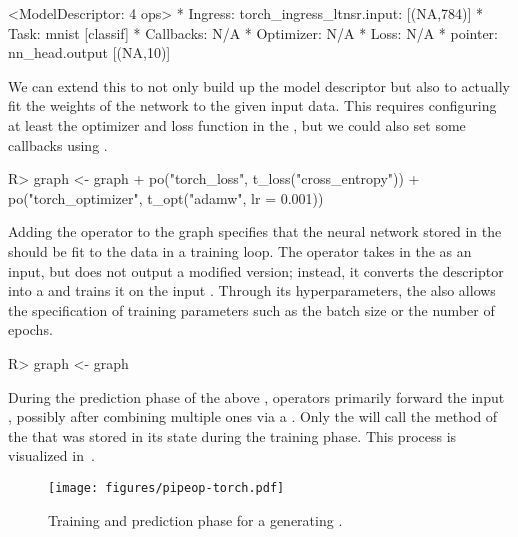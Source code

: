 \documentclass[article]{jss}
\theoremstyle{definition}
\begin{document}
\begin{CodeOutput}
<ModelDescriptor: 4 ops>
* Ingress:  torch_ingress_ltnsr.input: [(NA,784)]
* Task:  mnist [classif]
* Callbacks:  N/A
* Optimizer:  N/A
* Loss:  N/A
* pointer:  nn_head.output [(NA,10)]
\end{CodeOutput}

We can extend this  to not only build up the model descriptor but also to actually fit the weights of the network to the given input data.
This requires configuring at least the optimizer and loss function in the , but we could also set some callbacks using .

\begin{CodeInput}
R> graph <- graph %
+    po("torch_loss", t_loss("cross_entropy")) %
+    po("torch_optimizer", t_opt("adamw", lr = 0.001))
\end{CodeInput}

Adding the  operator to the graph specifies that the neural network stored in the  should be fit to the data in a training loop.
The operator takes in the  as an input, but does not output a modified version; instead, it converts the descriptor into a  and trains it on the input .
Through its hyperparameters, the  also allows the specification of training parameters such as the batch size or the number of epochs.

\begin{CodeInput}
R> graph <- graph %
\end{CodeInput}

During the prediction phase of the above ,   operators primarily forward the input , possibly after combining multiple ones via a .
Only the  will call the  method of the  that was stored in its state during the training phase.
This process is visualized in~.

\begin{figure}
    \centering
    \texttt{[image: figures/pipeop-torch.pdf]}
    \caption{Training and prediction phase for a generating .}
    \label{fig:pipeop-torch}
\end{figure}
\end{document}
